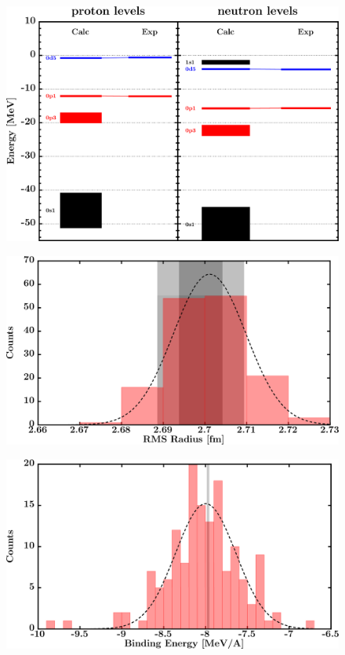 \documentclass[twocolumn,secnumarabic,amssymb, nobibnotes, aps, prl,
superscriptaddress, nobalancelastpage]{revtex4}
\begin{document}
\begin{figure}[!htb]
\begin{minipage}{0.4\linewidth}
        \label{DOM_o16_chargeDensity}
    \end{minipage}
    \begin{minipage}{0.35\linewidth}
        \centering
        \includegraphics[width=\linewidth]{figures/o16_SPLevels.png}
        \label{DOM_o16_SPLevels}
    \end{minipage}
    \begin{minipage}{0.4\linewidth}
        \centering
        \includegraphics[width=\linewidth]{figures/o16_RMSRadius.png}
        \label{DOM_o16_RMSRadius}
    \end{minipage}
    \begin{minipage}{0.4\linewidth}
        \centering
        \includegraphics[width=\linewidth]{figures/o16_BE.png}

\end{minipage}
\end{figure}
\end{document}
